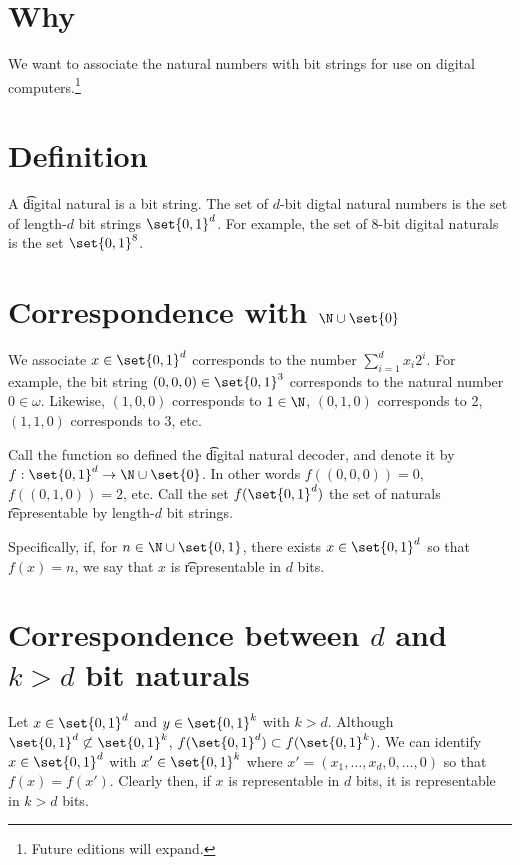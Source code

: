

\section*{Why}

We want to associate the natural numbers with bit strings for use on digital computers.\footnote{Future editions will expand.}

\section*{Definition}

A \t{digital natural} is a bit string.
The set of \t{$d$-bit digtal natural numbers} is the set of length-$d$ bit strings $\set{0, 1}^d$.
For example, the set of 8-bit digital naturals is the set $\set{0, 1}^8$.

\section*{Correspondence with $\N   \cup \set{0}$}

We associate $x \in \set{0, 1}^d$ corresponds to the number $\sum_{i = 1}^{d} x_i 2^i$.
For example, the bit string $(0,0,0) \in \set{0, 1}^3$ corresponds to the natural number $0 \in \omega $.
Likewise, $(1, 0, 0)$ corresponds to $1 \in \N  $, $(0, 1, 0)$ corresponds to 2, $(1, 1, 0)$ corresponds to 3, etc.

Call the function so defined the \t{digital natural decoder}, and denote it by $f: \set{0, 1}^d \to \N   \cup \set{0}$.
In other words $f((0, 0, 0)) = 0$, $f((0, 1, 0)) = 2$, etc.
Call the set $f(\set{0, 1}^d)$ the set of naturals \t{representable} by length-$d$ bit strings.

Specifically, if, for $n \in \N   \cup \set{0, 1}$, there exists $x \in \set{0, 1}^d$ so that $f(x) = n$, we say that $x$ is \t{representable in $d$ bits}.

\section*{Correspondence between $d$ and $k > d$ bit naturals}

Let $x \in \set{0, 1}^d$ and $y \in \set{0, 1}^k$ with $k > d$.
Although $\set{0, 1}^d \not\subset \set{0, 1}^k$, $f(\set{0, 1}^d) \subset f(\set{0, 1}^k)$.
We can identify $x \in \set{0, 1}^d$ with $x' \in \set{0, 1}^k$ where $x' = (x_1, \dots , x_d, 0, \dots , 0)$ so that $f(x) = f(x')$.
Clearly then, if $x$ is representable in $d$ bits, it is representable in $k > d$ bits.

